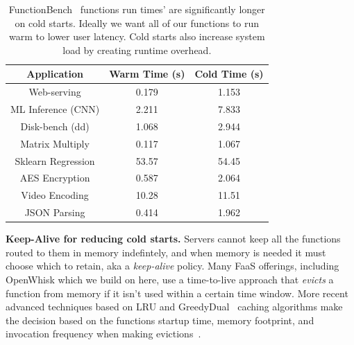 \begin{table}
  \begin{tabular}{ c c c }
\hline
  Application & Warm Time (s) & Cold Time (s) \\ 
\hline
  Web-serving & 0.179 & 1.153 \\  
  ML Inference (CNN) & 2.211 & 7.833 \\
  Disk-bench (dd) & 1.068 & 2.944 \\  
  Matrix Multiply & 0.117 & 1.067 \\  
  Sklearn Regression & 53.57 & 54.45 \\  
  AES Encryption & 0.587 & 2.064 \\  
  Video Encoding & 10.28 & 11.51 \\  
  JSON Parsing & 0.414 & 1.962 \\
\hline
\end{tabular}
\caption{FunctionBench~\cite{kim_functionbench_2019} functions run times' are significantly longer on cold starts. Ideally we want all of our functions to run warm to lower user latency. Cold starts also increase system load by creating runtime overhead.}
\label{tab:func-times}
\vspace*{-0.4cm}
\end{table}



\noindent \textbf{Keep-Alive for reducing cold starts.}
Servers cannot keep all the functions routed to them in memory indefintely, and when memory is needed it must choose which to retain, aka a \emph{keep-alive} policy.
Many FaaS offerings, including OpenWhisk which we build on here, use a time-to-live approach that \emph{evicts} a function from memory if it isn't used within a certain time window.
%
More recent advanced techniques based on LRU and GreedyDual~\cite{gdsf} caching algorithms make the decision based on the functions startup time, memory footprint, and invocation frequency when making evictions~\cite{faascache-asplos21}.

